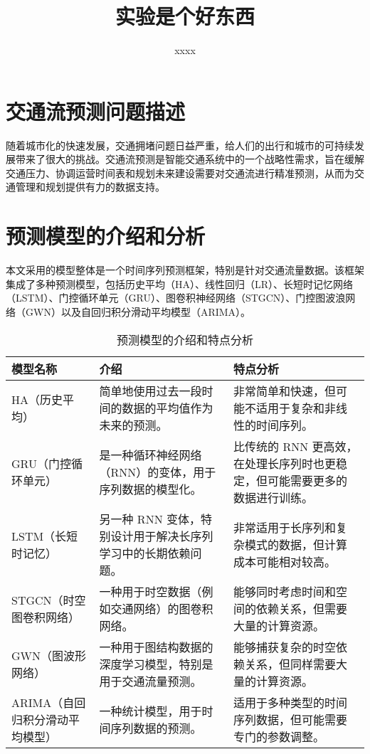 \documentclass[4pt]{article}
\title{实验是个好东西}
\author{xxxx}
\date{}
\begin{document}
\vspace{-10cm}
\maketitle

\section{交通流预测问题描述}

随着城市化的快速发展，交通拥堵问题日益严重，给人们的出行和城市的可持续发展带来了很大的挑战。交通流预测是智能交通系统中的一个战略性需求，旨在缓解交通压力、协调运营时间表和规划未来建设需要对交通流进行精准预测，从而为交通管理和规划提供有力的数据支持。

\section{预测模型的介绍和分析} 

本文采用的模型整体是一个时间序列预测框架\cite{teach2021}，特别是针对交通流量数据。该框架集成了多种预测模型，包括历史平均（HA）、线性回归（LR）、长短时记忆网络（LSTM）、门控循环单元（GRU）、图卷积神经网络（STGCN）、门控图波浪网络（GWN）以及自回归积分滑动平均模型（ARIMA）。
    
\begin{table}[H]
    \centering
    \small %
    \begin{tabularx}{\textwidth}{|X|X|X|}
        \hline
        \textbf{模型名称} & \textbf{介绍} & \textbf{特点分析} \\
        \hline
        HA（历史平均） & 简单地使用过去一段时间的数据的平均值作为未来的预测。 & 非常简单和快速，但可能不适用于复杂和非线性的时间序列。 \\
        \hline
        GRU（门控循环单元） & 是一种循环神经网络（RNN）的变体，用于序列数据的模型化。 & 比传统的 RNN 更高效，在处理长序列时也更稳定，但可能需要更多的数据进行训练。 \\
        \hline
        LSTM（长短时记忆） & 另一种 RNN 变体，特别设计用于解决长序列学习中的长期依赖问题。 & 非常适用于长序列和复杂模式的数据，但计算成本可能相对较高。 \\
        \hline
        STGCN（时空图卷积网络） & 一种用于时空数据（例如交通网络）的图卷积网络。 & 能够同时考虑时间和空间的依赖关系，但需要大量的计算资源。 \\
        \hline
        GWN（图波形网络） & 一种用于图结构数据的深度学习模型，特别是用于交通流量预测。 & 能够捕获复杂的时空依赖关系，但同样需要大量的计算资源。 \\
        \hline
        ARIMA（自回归积分滑动平均模型） & 一种统计模型，用于时间序列数据的预测。 & 适用于多种类型的时间序列数据，但可能需要专门的参数调整。 \\
        \hline
    \end{tabularx}
    \caption{预测模型的介绍和特点分析}
    \label{tab:model_analysis}
    \normalsize %
\end{table}
\end{document}
